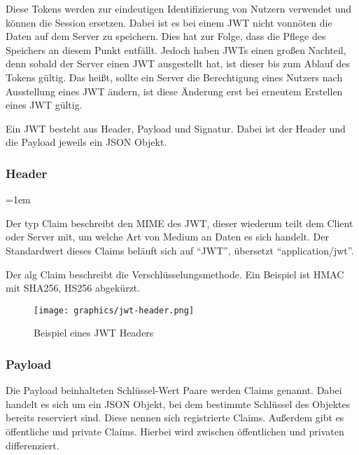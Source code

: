 Diese Tokens werden zur eindeutigen Identifizierung von Nutzern verwendet und können die Session ersetzen. Dabei ist es bei einem \gls{JWT} nicht vonnöten die Daten auf dem Server zu speichern. Dies hat zur Folge, dass die Pflege des Speichers an diesem Punkt entfällt. Jedoch haben \gls{JWT}s einen gro{\ss}en Nachteil, denn sobald der Server einen \gls{JWT} ausgestellt hat, ist dieser bis zum Ablauf des Tokens gültig. Das hei{\ss}t, sollte ein Server die Berechtigung eines Nutzers nach Ausstellung eines \gls{JWT} ändern, ist diese Änderung erst bei erneutem Erstellen eines \gls{JWT} gültig.

Ein \gls{JWT} besteht aus Header, Payload und Signatur. Dabei ist der Header und die Payload jeweils ein \gls{JSON} Objekt.

\subsubsection{Header}
\label{sec: jwt_header}

\begin{description}
	\leftskip=1em
	\item[typ] Der typ Claim beschreibt den \gls{MIME} des \gls{JWT}, dieser wiederum teilt dem Client oder Server mit, um welche Art von Medium an Daten es sich handelt. Der Standardwert dieses Claims beläuft sich auf \enquote{JWT}, übersetzt \enquote{application/jwt}.
	\item[alg] Der alg Claim beschreibt die Verschlüsselungsmethode. Ein Beispiel ist \gls{HMAC} mit \gls{SHA256}, HS256 abgekürzt.
\end{description}

\begin{figure}[h]
	\centering
	\texttt{[image: graphics/jwt-header.png]}
	\caption{Beispiel eines \gls{JWT} Headers }
	\label{fig:jwt-header}
\end{figure}

\subsubsection{Payload}
\label{sec: jwt-payload}

Die Payload beinhalteten Schlüssel-Wert Paare werden Claims genannt. Dabei handelt es sich um ein JSON Objekt, bei dem bestimmte Schlüssel des Objektes bereits reserviert sind. Diese nennen sich registrierte Claims. Au{\ss}erdem gibt es öffentliche und private Claims. Hierbei wird zwischen öffentlichen und privaten differenziert.

